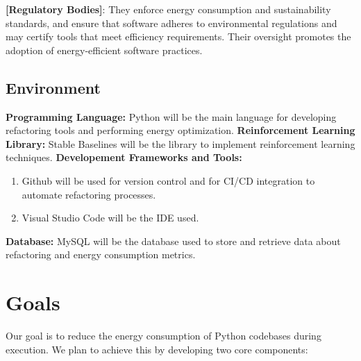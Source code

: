 \documentclass{article}
\begin{document}
\noindent
\textbf{[Regulatory Bodies]}: They enforce energy consumption and sustainability standards, and ensure that software adheres to environmental regulations and may certify tools that meet efficiency requirements. Their oversight promotes the adoption of energy-efficient software practices.

\subsection{Environment}
\textbf{Programming Language:} Python will be the main language for developing refactoring tools and performing energy optimization.
\textbf{Reinforcement Learning Library: } Stable Baselines will be the library to implement reinforcement learning techniques.
\textbf{Developement Frameworks and Tools: } 
\begin{enumerate}
    \item Github will be used for version control and for CI/CD integration to automate refactoring processes.
    \item Visual Studio Code will be the IDE used.
\end{enumerate} 
\textbf{Database: } MySQL will be the database used to store and retrieve data about refactoring and energy consumption metrics.


\section{Goals}

Our goal is to reduce the energy consumption of Python codebases during execution. We plan to achieve this by developing two core components:
\end{document}
